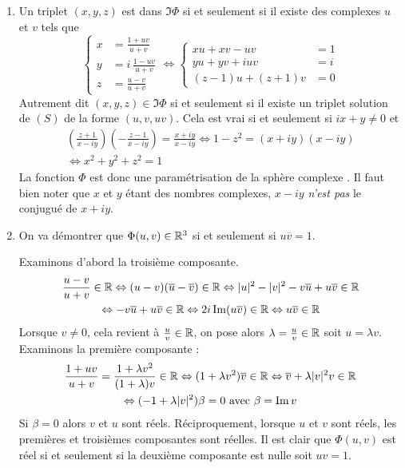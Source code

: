 \begin{enumerate}
 \item Un triplet $(x,y,z)$ est dans $\Im \Phi$ si et seulement si il existe des complexes $u$ et $v$ tels que
\begin{displaymath}
 \left\lbrace 
\begin{aligned}
 x &= \frac{1+uv}{u+v}\\
 y &= i\,\frac{1-uv}{u+v}\\
 z &= \frac{u-v}{u+v}
\end{aligned}
\right. 
\Leftrightarrow
\left\lbrace 
\begin{aligned}
 xu + xv - uv &= 1\\
 yu + yv + iuv &= i \\
 (z-1)u + (z+1)v &= 0
\end{aligned}
\right. 
\end{displaymath}
Autrement dit $(x,y,z)\in \Im \Phi$ si et seulement si il existe un triplet solution de $(S)$ de la forme $(u,v,uv)$. Cela est vrai si et seulement si $ix+y\neq 0$ et
\begin{multline*}
 \left( \frac{z+1}{x-iy}\right)\left( -\frac{z-1}{x-iy}\right)
= \frac{x+iy}{x-iy}
\Leftrightarrow
1-z^2 = (x+iy)(x-iy)\\
\Leftrightarrow x^2+y^2+z^2 = 1
\end{multline*}
 La fonction $\Phi$ est donc une paramétrisation de la \og sphère complexe \fg. Il faut bien noter que $x$ et $y$ étant des nombres complexes, $x-iy$ \emph{n'est pas} le conjugué de $x+iy$.

\item On va démontrer que $\Phi(u,v)\in\mathbb{R}^3$ si et seulement si $u\overline{v}=1$.

Examinons d'abord la troisième composante.
\begin{multline*}
 \frac{u-v}{u+v}\in \mathbb{R} \Leftrightarrow (u-v)(\overline{u}-\overline{v})\in \mathbb{R}
\Leftrightarrow |u|^2 - |v|^2 -v\overline{u}+u\overline{v}\in \mathbb{R} \\
\Leftrightarrow -v\overline{u}+u\overline{v}\in \mathbb{R} 
\Leftrightarrow 2i \operatorname{Im}(u\overline{v})\in \mathbb{R} 
\Leftrightarrow u\overline{v} \in \mathbb{R}
\end{multline*}
Lorsque $v\neq 0$, cela revient à $\frac{u}{v}\in \mathbb{R}$, on pose alors $\lambda =\frac{u}{v}\in \mathbb{R}$ soit $u=\lambda v$. Examinons la première composante :
\begin{multline*}
 \frac{1+uv}{u+v}=\frac{1+\lambda v^2}{(1+\lambda)v}\in \mathbb{R}
\Leftrightarrow (1+\lambda v^2)\overline{v}\in \mathbb{R} 
\Leftrightarrow \overline{v} + \lambda |v|^2 v\in \mathbb{R} \\
\Leftrightarrow(-1+\lambda |v|^2)\beta =0 \text{ avec } \beta=\operatorname{Im} v
\end{multline*}
Si $\beta=0$ alors $v$ et $u$ sont réels.\newline
Réciproquement, lorsque $u$ et $v$ sont réels, les premières et troisièmes composantes sont réelles. Il est clair que $\Phi(u,v)$ est réel si et seulement si la deuxième composante est nulle soit $uv=1$.


\end{enumerate}
